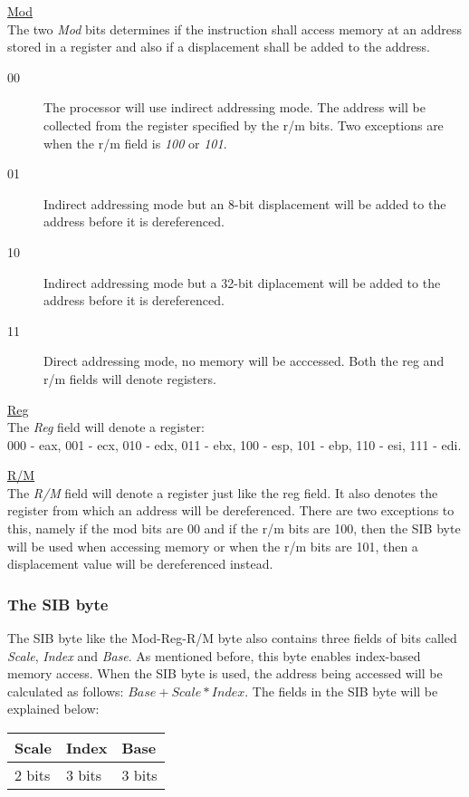\documentclass[11pt,twoside]{eitExjobb}
\begin{document}
\noindent \uline{Mod}\\
The two \emph{Mod} bits determines if the instruction shall access memory at an address stored in a register and also if a displacement shall be added to the address.\\
\begin{description}
\item[00] The processor will use indirect addressing mode. The address will be collected from the register specified by the r/m bits. Two exceptions are when the r/m field is \emph{100} or \emph{101}.  
\item[01] Indirect addressing mode but an 8-bit displacement will be added to the address before it is dereferenced.
\item[10] Indirect addressing mode but a 32-bit diplacement will be added to the address before it is dereferenced.
\item[11] Direct addressing mode, no memory will be acccessed. Both the reg and r/m fields will denote registers.
\end{description}

\noindent \uline{Reg}\\
The \emph{Reg} field will denote a register: \\ 000 - eax, 001 - ecx, 010 - edx, 011 - ebx, 100 - esp, 101 - ebp, 110 - esi, 111 - edi.


\noindent \uline{R/M}\\
The \emph{R/M} field will denote a register just like the reg field. It also denotes the register from which an address will be dereferenced. There are two exceptions to this, namely if the mod bits are 00 and if the r/m bits are 100, then the SIB byte will be used when accessing memory or when the r/m bits are 101, then a displacement value will be dereferenced instead.

\subsubsection{The SIB byte}
The SIB byte like the Mod-Reg-R/M byte also contains three fields of bits called \emph{Scale}, \emph{Index} and \emph{Base}. As mentioned before, this byte enables index-based memory access. When the SIB byte is used, the address being accessed will be calculated as follows:
$Base + Scale*Index$. The fields in the SIB byte will be explained below:\\

\begin{tabular}{|l|l|l|}
\hline
Scale & Index & Base \\
\hline
2 bits & 3 bits & 3 bits \\
\hline
\end{tabular}
\\\\
\end{document}
